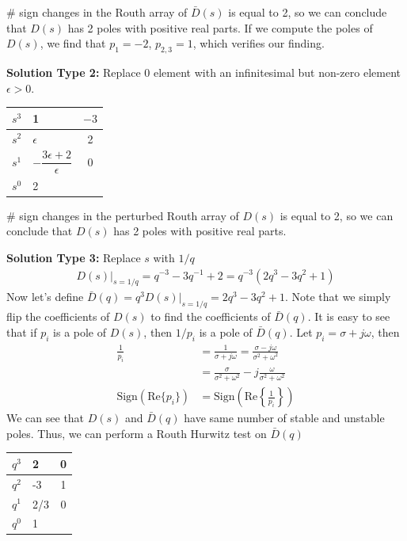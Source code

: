 \documentclass[twoside]{article}
\begin{document}
%
$\#$ sign changes in the Routh array of $\bar{D}(s)$ is equal to 2, so
we can conclude that $D(s)$ has 2 poles with positive real parts. If
we compute the poles of $D(s)$, we find that $p_1 = -2$, $p_{2,3} = 1$,
which verifies our finding. 

\vspace{12pt}

\textbf{Solution Type 2:} Replace 0 element with an infinitesimal but
non-zero element $\epsilon >0$.
%

\begin{center}
\begin{tabular}{|c || F || c  |}
\hline
$s^3$ & 1 & $-3$ 
\\ \hline
$s^2$ & $\epsilon$ & 2
\\ \hline
$s^1$  & $- \dfrac{3 \epsilon + 2}{\epsilon}$ & 0 
\\ \hline
$s^0$  & 2 & 
\\ \hline
\end{tabular}
\end{center}


$\#$ sign changes in the perturbed Routh array of $D(s)$ is equal to 2, so
we can conclude that $D(s)$ has 2 poles with positive real parts.

\textbf{Solution Type 3:} Replace $s$ with $1/q$
%
\begin{align*}
  D(s)|_{s =1/q} = q^{-3} - 3 q^{-1} + 2 = q^{-3} 
  \left( 2 q^{3} - 3 q^2 + 1 \right)
\end{align*}
%
Now let's define $\bar{D}(q) = q^3 D(s)|_{s =1/q} =  2 q^3 - 3 q^2 +
1$. 
Note that we simply flip the coefficients of $D(s)$
to find the coefficients of $\bar{D}(q)$. It is easy to see that 
if $p_i$ is a pole of $D(s)$, then $1/p_i$ is a pole of $\bar{D}(q)$.
Let $p_i = \sigma + j \omega$, then 
%
\begin{align*}
  \frac{1}{p_i} &= \frac{1}{\sigma + j \omega} = \frac{\sigma - j
  \omega}{\sigma^2 + \omega^2}
\\
&= \frac{\sigma}{\sigma^2 + \omega^2} - j \frac{
  \omega}{\sigma^2 + \omega^2}
\\
\mathrm{Sign} ( \mathrm{Re} \lbrace p_i \rbrace ) &= 
\mathrm{Sign} \left( \mathrm{Re} \left\lbrace \frac{1}{p_i} \right\rbrace \right)
\end{align*}
%
We can see that $D(s)$ and $\bar{D}(q)$ have same number of stable
and unstable poles. Thus, we can perform a Routh Hurwitz test on
$\bar{D}(q)$
%

\begin{center}
\begin{tabular}{|c || F || c  |}
\hline
$q^3$ & 2 & 0 
\\ \hline
$q^2$ & -3 & 1
\\ \hline
$q^1$  & 2/3 & 0 
\\ \hline
$q^0$  & 1 & 
\\ \hline
\end{tabular}
\end{center}
\end{document}
